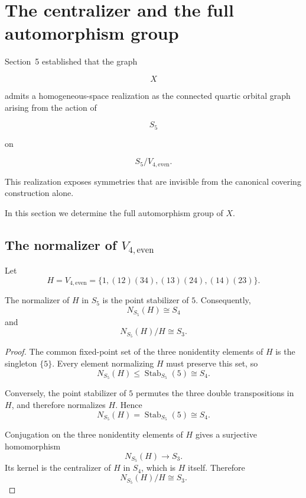 \section{The centralizer and the full automorphism group}

Section~5 established that the graph

\[
X
\]

admits a homogeneous-space realization as the connected quartic orbital
graph arising from the action of

\[
S_{5}
\]

on

\[
S_{5}/V_{4,\mathrm{even}}.
\]

This realization exposes symmetries that are invisible from the canonical
covering construction alone.

In this section we determine the full automorphism group of \(X\).


\subsection{The normalizer of \(V_{4,\mathrm{even}}\)}


Let
\[
H
=
V_{4,\mathrm{even}}
=
\{
1,
(12)(34),
(13)(24),
(14)(23)
\}.
\]

\begin{proposition}
\label{prop:normalizer-quotient}
The normalizer of \(H\) in \(S_5\) is the point stabilizer of \(5\).
Consequently,
\[
N_{S_5}(H)\cong S_4
\]
and
\[
N_{S_5}(H)/H\cong S_3.
\]
\end{proposition}

\begin{proof}
The common fixed-point set of the three nonidentity elements of \(H\) is
the singleton \(\{5\}\). Every element normalizing \(H\) must preserve
this set, so
\[
N_{S_5}(H)
\leq
\operatorname{Stab}_{S_5}(5)
\cong
S_4.
\]

Conversely, the point stabilizer of \(5\) permutes the three double
transpositions in \(H\), and therefore normalizes \(H\). Hence
\[
N_{S_5}(H)
=
\operatorname{Stab}_{S_5}(5)
\cong
S_4.
\]

Conjugation on the three nonidentity elements of \(H\) gives a surjective
homomorphism
\[
N_{S_5}(H)\longrightarrow S_3.
\]
Its kernel is the centralizer of \(H\) in \(S_4\), which is \(H\) itself.
Therefore
\[
N_{S_5}(H)/H
\cong
S_3.
\]
\end{proof}

